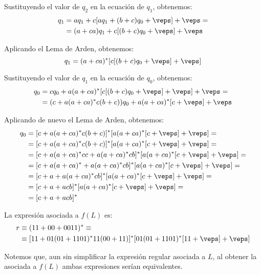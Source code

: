 \documentclass[12pt]{article}
\begin{document}
\begin{ejercicio}[2.5 puntos]
\begin{enumerate}
        Sustituyendo el valor de $q_2$ en la ecuación de $q_1$, obtenemos:
        \begin{align*}
            q_1 &= aq_1+c[aq_1+(b+c)q_0+\veps]+\veps
            =\\&= (a+ca)q_1+c[(b+c)q_0+\veps]+\veps
        \end{align*}

        Aplicando el Lema de Arden, obtenemos:
        \begin{equation*}
            q_1 = (a+ca)^*[c[(b+c)q_0+\veps]+\veps]
        \end{equation*}

        Sustituyendo el valor de $q_1$ en la ecuación de $q_0$, obtenemos:
        \begin{align*}
            q_0 &= cq_0+a(a+ca)^*[c[(b+c)q_0+\veps]+\veps]+\veps
            =\\&= (c+a(a+ca)^*c(b+c))q_0+a(a+ca)^*[c+\veps]+\veps
        \end{align*}

        Aplicando de nuevo el Lema de Arden, obtenemos:
        \begin{align*}
            q_0 &= [c+a(a+ca)^*c(b+c)]^*[a(a+ca)^*[c+\veps]+\veps]
            =\\&= [c+a(a+ca)^*c(b+c)]^*[a(a+ca)^*[c+\veps]+\veps]
            =\\&= [c+a(a+ca)^*cc + a(a+ca)^*cb]^*[a(a+ca)^*[c+\veps]+\veps]
            =\\&= [c+a(a+ca)^* + a(a+ca)^*cb]^*[a(a+ca)^*[c+\veps]+\veps]
            =\\&= [c+a+ a(a+ca)^*cb]^*[a(a+ca)^*[c+\veps]+\veps]
            =\\&= [c+a+ acb]^*[a(a+ca)^*[c+\veps]+\veps]
            =\\&= [c+a+ acb]^*
        \end{align*}

        La expresión asociada a $f(L)$ es:
        \begin{align*}
            r& \equiv (11+00+0011)^*
            \equiv \\&\equiv [11+01(01+1101)^*11(00+11)]^*[01(01+1101)^*[11+\veps]+\veps]
        \end{align*}
        
        Notemos que, aun sin simplificar la expresión regular asociada a $L$, al obtener la asociada a $f(L)$ ambas expresiones serían equivalentes.
    \end{enumerate}
\end{ejercicio}
\end{document}
